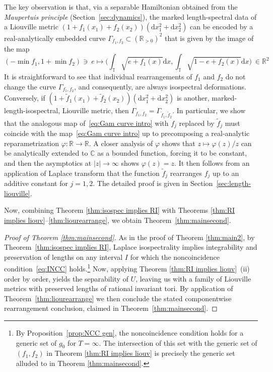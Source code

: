 \documentclass[11pt,letterpaper,oneside]{amsart}
\newcommand{\C}{\mathbb{C}}
\newcommand{\R}{\mathbb{R}}
\newcommand{\T}{\mathbb{T}}
\theoremstyle{definition}
\theoremstyle{remark}
\newcommand{\wt}{\widetilde}
\theoremstyle{definition}
\theoremstyle{remark}
\newcommand{\dif}{\mathrm{d}}
\begin{document}
The key observation is that, via a separable Hamiltonian obtained from the \emph{Maupertuis principle} (Section~\ref{sec:dynamics}), the marked length-spectral data of a Liouville metric $(1+f_1(x_1)+f_2(x_2))(\dif x_1^2+\dif x_2^2)$ can be encoded by a real-analytically embedded curve $\Gamma_{f_1, f_2} \subset (\R_{>0})^2$ that is given by the image of the map
\begin{equation}\label{eq:Gam curve intro}
    (-\min f_1, 1 + \min f_2) \ni \ e \longmapsto \bigg(\int_{\T}\sqrt{e + f_1(x)} \dif x, \int_{\T}\sqrt{ 1- e + f_2(x)} \dif x \bigg) \ \in \R^2
\end{equation}
It is straightforward to see that individual rearrangements of $f_1$ and $f_2$ do not change the curve $\Gamma_{f_1, f_2}$, and consequently, are always isospectral deformations.
Conversely, if $(1+\tilde f_1(x_1)+\tilde f_2(x_2))(\dif x_1^2+\dif x_2^2)$ is another, marked-length-isospectral, Liouville metric, then $\Gamma_{f_1, f_2} = \Gamma_{\tilde f_1, \tilde f_2}$.
In particular, we show that the analogous map of~\eqref{eq:Gam curve intro} with $f_j$ replaced by $\wt f_j$ must coincide with the map~\eqref{eq:Gam curve intro} up to precomposing a real-analytic reparametrization $\varphi:\R\to \R$.
A closer analysis of $\varphi$ shows that $z \mapsto \varphi(z)/z$ can be analytically extended to $\C$ as a bounded function, forcing it to be constant, and then the asymptotics at $|z| \to \infty$ shows $\varphi(z)=z$.
It then follows from an application of Laplace transform that the function $\tilde f_j$ rearranges $f_j$ up to an additive constant for $j = 1,2$.
The detailed proof is given in Section~\ref{sec:length-liouville}. 

\medskip


Now, combining Theorem \ref{thm:isospec implies RI} with Theorems \ref{thm:RI implies liouv}--\ref{thm:liourearrange}, we obtain Theorem~\ref{thm:mainsecond}. 

\begin{proof}[Proof of Theorem \ref{thm:mainsecond}]
     {As in the proof of Theorem \ref{thm:main2}, by Theorem~\ref{thm:isospec implies RI}, Laplace isospectrality implies integrability and preservation of lengths on any interval $I$ for which the noncoincidence condition~\eqref{eq:INCC} holds.\footnote{By Proposition~\ref{prop:NCC gen}, the noncoincidence condition holds for a generic set of $g_0$ for $T = \infty$. The intersection of this set with the generic set of $(f_1, f_2)$ in Theorem \ref{thm:RI implies liouv} is precisely the generic set alluded to in Theorem \ref{thm:mainsecond}.} Now, applying Theorem \ref{thm:RI implies liouv}~(ii) order by order, yields the separability of $U$, leaving us with a family of Liouville metrics with preserved lengths of rational invariant tori. By application of Theorem~\ref{thm:liourearrange} we then conclude the stated componentwise rearrangement conclusion, claimed in Theorem~\ref{thm:mainsecond}.}
\end{proof}
\end{document}
